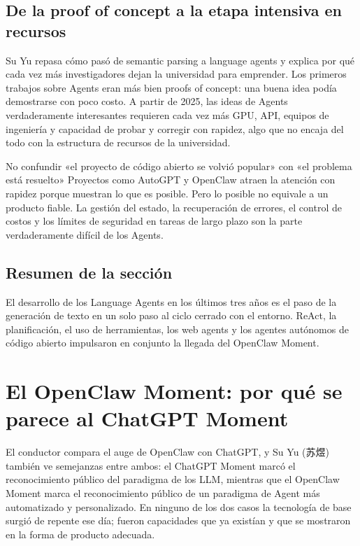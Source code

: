 \documentclass[a4paper]{article}
\begin{document}
\subsection{De la proof of concept a la etapa intensiva en recursos}

Su Yu repasa cómo pasó de semantic parsing a language agents y explica por qué cada vez más investigadores dejan la universidad para emprender. Los primeros trabajos sobre Agents eran más bien proofs of concept: una buena idea podía demostrarse con poco costo. A partir de 2025, las ideas de Agents verdaderamente interesantes requieren cada vez más GPU, API, equipos de ingeniería y capacidad de probar y corregir con rapidez, algo que no encaja del todo con la estructura de recursos de la universidad.

\begin{warningbox}{No confundir «el proyecto de código abierto se volvió popular» con «el problema está resuelto»}
Proyectos como AutoGPT y OpenClaw atraen la atención con rapidez porque muestran lo que es posible. Pero lo posible no equivale a un producto fiable. La gestión del estado, la recuperación de errores, el control de costos y los límites de seguridad en tareas de largo plazo son la parte verdaderamente difícil de los Agents.
\end{warningbox}

\subsection{Resumen de la sección}

El desarrollo de los Language Agents en los últimos tres años es el paso de la generación de texto en un solo paso al ciclo cerrado con el entorno. ReAct, la planificación, el uso de herramientas, los web agents y los agentes autónomos de código abierto impulsaron en conjunto la llegada del OpenClaw Moment.
\section{El OpenClaw Moment: por qué se parece al ChatGPT Moment}

El conductor compara el auge de OpenClaw con ChatGPT, y Su Yu (苏煜) también ve semejanzas entre ambos: el ChatGPT Moment marcó el reconocimiento público del paradigma de los LLM, mientras que el OpenClaw Moment marca el reconocimiento público de un paradigma de Agent más automatizado y personalizado. En ninguno de los dos casos la tecnología de base surgió de repente ese día; fueron capacidades que ya existían y que se mostraron en la forma de producto adecuada.
\end{document}
